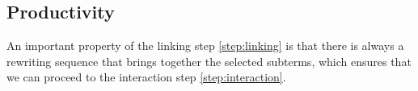\begin{scope}




\section{Productivity}

An important property of the linking step \ref{step:linking} is that there is
always a rewriting sequence that brings together the selected subterms, which
ensures that we can proceed to the interaction step \ref{step:interaction}.





\end{scope}
